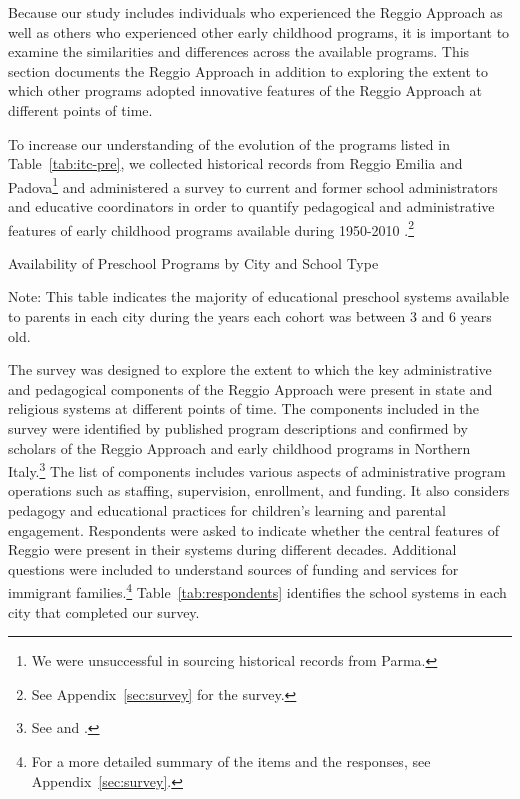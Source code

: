 Because our study includes individuals who experienced the Reggio Approach as well as others who experienced other early childhood programs, it is important to examine the similarities and differences across the available programs. This section documents the Reggio Approach in addition to exploring the extent to which other programs adopted innovative features of the Reggio Approach at different points of time.

To increase our understanding of the evolution of the programs listed in Table~\ref{tab:itc-pre}, we collected historical records from Reggio Emilia and Padova\footnote{We were unsuccessful in sourcing historical records from Parma.} \citep{Padova-Admin-Data_1964-2011,Reggio-Admin-data_1966-2006,Reggio-Annual-Journals_1994-2011} and administered a survey to current and former school administrators and educative coordinators in order to quantify pedagogical and administrative features of early childhood programs available during 1950-2010 \citep{CEHD_2016_Historical-Analysis}.\footnote{See Appendix~\ref{sec:survey} for the survey.}
~\\
\begin{table}[H]
\centering
\caption{Availability of Preschool Programs by City and School Type}\label{tab:itc-pre}
\begin{adjustbox}{width=\textwidth}
\begin{threeparttable}
	
\begin{tablenotes}
Note: This table indicates the majority of educational preschool systems available to parents in each city during the years each cohort was between 3 and 6 years old.
\end{tablenotes}
\end{threeparttable}
\end{adjustbox}
\end{table}

The survey was designed to explore the extent to which the key administrative and pedagogical components of the Reggio Approach were present in state and religious systems at different points of time. The components included in the survey were identified by published program descriptions and confirmed by scholars of the Reggio Approach and early childhood programs in Northern Italy.\footnote{See \citet{Edwards-etal-eds_1998_Hundred-Languages} and \citet{Corsaro_2008_Policy-Practice}.} The list of components includes various aspects of administrative program operations such as staffing, supervision, enrollment, and funding. It also considers pedagogy and educational practices for children's learning and parental engagement. Respondents were asked to indicate whether the central features of Reggio were present in their systems during different decades. Additional questions were included to understand sources of funding and services for immigrant families.\footnote{For a more detailed summary of the items and the responses, see Appendix~\ref{sec:survey}.} Table~\ref{tab:respondents} identifies the school systems in each city that completed our survey.

